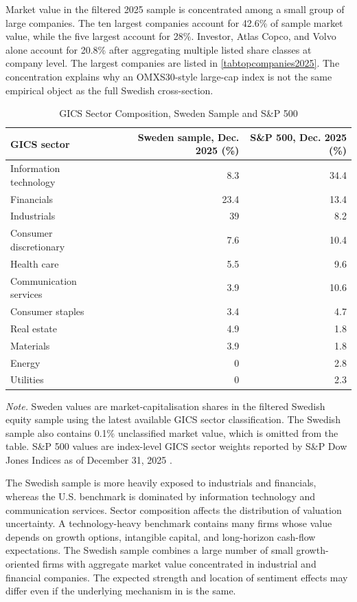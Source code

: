 \documentclass[11pt]{article}
\begin{document}
Market value in the filtered 2025 sample is concentrated among a small group of large companies. The ten largest companies account for 42.6\% of sample market value, while the five largest account for 28\%. Investor, Atlas Copco, and Volvo alone account for 20.8\% after aggregating multiple listed share classes at company level. The largest companies are listed in \cref{tabtopcompanies2025}. The concentration explains why an OMXS30-style large-cap index is not the same empirical object as the full Swedish cross-section.

\begin{table}[H]
\centering
\caption{GICS Sector Composition, Sweden Sample and S\&P 500}
\label{tabmarketsectorcomparison}
\small
\begin{tabularx}{0.92\textwidth}{Xrr}
\toprule
GICS sector & Sweden sample, Dec. 2025 (\%) & S\&P 500, Dec. 2025 (\%) \\
\midrule
Information technology & 8.3 & 34.4 \\
Financials & 23.4 & 13.4 \\
Industrials & 39& 8.2 \\
Consumer discretionary & 7.6 & 10.4 \\
Health care & 5.5 & 9.6 \\
Communication services & 3.9 & 10.6 \\
Consumer staples & 3.4 & 4.7 \\
Real estate & 4.9 & 1.8 \\
Materials & 3.9 & 1.8 \\
Energy & 0& 2.8 \\
Utilities & 0& 2.3 \\
\bottomrule
\end{tabularx}
\begin{minipage}{0.92\textwidth}
\footnotesize \textit{Note.} Sweden values are market-capitalisation shares in the filtered Swedish equity sample using the latest available GICS sector classification. The Swedish sample also contains 0.1\% unclassified market value, which is omitted from the table. S\&P 500 values are index-level GICS sector weights reported by S\&P Dow Jones Indices as of December 31, 2025 \citep{spglobal2026marketattributes}.
\end{minipage}
\end{table}

The Swedish sample is more heavily exposed to industrials and financials, whereas the U.S. benchmark is dominated by information technology and communication services. Sector composition affects the distribution of valuation uncertainty. A technology-heavy benchmark contains many firms whose value depends on growth options, intangible capital, and long-horizon cash-flow expectations. The Swedish sample combines a large number of small growth-oriented firms with aggregate market value concentrated in industrial and financial companies. The expected strength and location of sentiment effects may differ even if the underlying mechanism in \citet{baker2006sentiment} is the same.
\end{document}
